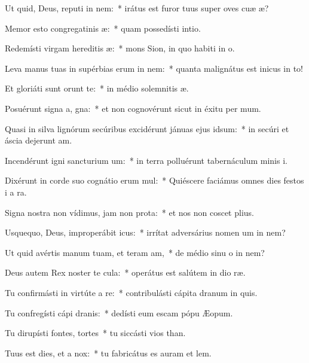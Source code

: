\item Ut quid, Deus, reputi in nem:~* irátus est furor tuus super oves cuæ æ?
\item Memor esto congregatinis æ:~* quam possedísti  intio.
\item Redemísti virgam hereditis æ:~* mons Sion, in quo habiti in o.
\item Leva manus tuas in supérbias erum in nem:~* quanta malignátus est inicus in to!
\item Et gloriáti sunt  orunt te:~* in médio solemnitis æ.
\item Posuérunt signa a, gna:~* et non cognovérunt sicut in éxitu per mum.
\item Quasi in silva lignórum secúribus excidérunt jánuas ejus  idsum:~* in secúri et áscia dejerunt am.
\item Incendérunt igni sancturium um:~* in terra polluérunt tabernáculum minis i.
\item Dixérunt in corde suo cognátio erum mul:~* Quiéscere faciámus omnes dies festos i a ra.
\item Signa nostra non vídimus, jam non  prota:~* et nos non coscet plius.
\item Usquequo, Deus, improperábit icus:~* irrítat adversárius nomen um in nem?
\item Ut quid avértis manum tuam, et teram am,~* de médio sinu o in nem?
\item Deus autem Rex noster te cula:~* operátus est salútem in dio ræ.
\item Tu confirmásti in virtúte a re:~* contribulásti cápita dranum in quis.
\item Tu confregísti cápi dranis:~* dedísti eum escam pópu Æopum.
\item Tu dirupísti fontes,  tortes~* tu siccásti vios than.
\item Tuus est dies, et a  nox:~* tu fabricátus es auram et lem.
